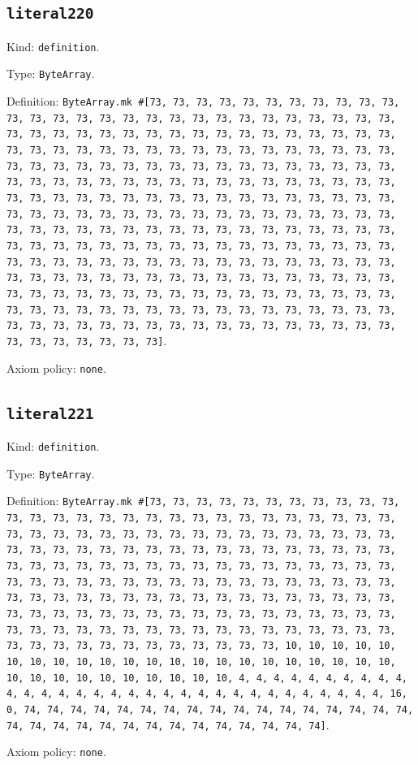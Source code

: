 \documentclass[11pt]{article}
\begin{document}
\subsection*{\texttt{literal220}}
\noindent Kind: \texttt{definition}.\par
\noindent Type: \texttt{ByteArray}.\par
\noindent Definition: \texttt{ByteArray.mk \#[73, 73, 73, 73, 73, 73, 73, 73, 73, 73, 73, 73, 73, 73, 73, 73, 73, 73, 73, 73, 73, 73, 73, 73, 73, 73, 73, 73, 73, 73, 73, 73, 73, 73, 73, 73, 73, 73, 73, 73, 73, 73, 73, 73, 73, 73, 73, 73, 73, 73, 73, 73, 73, 73, 73, 73, 73, 73, 73, 73, 73, 73, 73, 73, 73, 73, 73, 73, 73, 73, 73, 73, 73, 73, 73, 73, 73, 73, 73, 73, 73, 73, 73, 73, 73, 73, 73, 73, 73, 73, 73, 73, 73, 73, 73, 73, 73, 73, 73, 73, 73, 73, 73, 73, 73, 73, 73, 73, 73, 73, 73, 73, 73, 73, 73, 73, 73, 73, 73, 73, 73, 73, 73, 73, 73, 73, 73, 73, 73, 73, 73, 73, 73, 73, 73, 73, 73, 73, 73, 73, 73, 73, 73, 73, 73, 73, 73, 73, 73, 73, 73, 73, 73, 73, 73, 73, 73, 73, 73, 73, 73, 73, 73, 73, 73, 73, 73, 73, 73, 73, 73, 73, 73, 73, 73, 73, 73, 73, 73, 73, 73, 73, 73, 73, 73, 73, 73, 73, 73, 73, 73, 73, 73, 73, 73, 73, 73, 73, 73, 73, 73, 73, 73, 73, 73, 73, 73, 73, 73, 73, 73, 73, 73, 73, 73, 73, 73, 73, 73, 73, 73, 73, 73, 73, 73, 73, 73, 73, 73, 73, 73, 73, 73, 73, 73, 73, 73, 73, 73, 73, 73, 73, 73, 73, 73, 73, 73, 73, 73, 73, 73, 73, 73, 73, 73, 73]}.\par
\noindent Axiom policy: \texttt{none}.\par
\subsection*{\texttt{literal221}}
\noindent Kind: \texttt{definition}.\par
\noindent Type: \texttt{ByteArray}.\par
\noindent Definition: \texttt{ByteArray.mk \#[73, 73, 73, 73, 73, 73, 73, 73, 73, 73, 73, 73, 73, 73, 73, 73, 73, 73, 73, 73, 73, 73, 73, 73, 73, 73, 73, 73, 73, 73, 73, 73, 73, 73, 73, 73, 73, 73, 73, 73, 73, 73, 73, 73, 73, 73, 73, 73, 73, 73, 73, 73, 73, 73, 73, 73, 73, 73, 73, 73, 73, 73, 73, 73, 73, 73, 73, 73, 73, 73, 73, 73, 73, 73, 73, 73, 73, 73, 73, 73, 73, 73, 73, 73, 73, 73, 73, 73, 73, 73, 73, 73, 73, 73, 73, 73, 73, 73, 73, 73, 73, 73, 73, 73, 73, 73, 73, 73, 73, 73, 73, 73, 73, 73, 73, 73, 73, 73, 73, 73, 73, 73, 73, 73, 73, 73, 73, 73, 73, 73, 73, 73, 73, 73, 73, 73, 73, 73, 73, 73, 73, 73, 73, 73, 73, 73, 73, 73, 73, 73, 73, 73, 73, 73, 73, 73, 73, 73, 73, 10, 10, 10, 10, 10, 10, 10, 10, 10, 10, 10, 10, 10, 10, 10, 10, 10, 10, 10, 10, 10, 10, 10, 10, 10, 10, 10, 10, 10, 10, 10, 10, 4, 4, 4, 4, 4, 4, 4, 4, 4, 4, 4, 4, 4, 4, 4, 4, 4, 4, 4, 4, 4, 4, 4, 4, 4, 4, 4, 4, 4, 4, 4, 4, 16, 0, 74, 74, 74, 74, 74, 74, 74, 74, 74, 74, 74, 74, 74, 74, 74, 74, 74, 74, 74, 74, 74, 74, 74, 74, 74, 74, 74, 74, 74, 74, 74]}.\par
\noindent Axiom policy: \texttt{none}.\par
\end{document}
